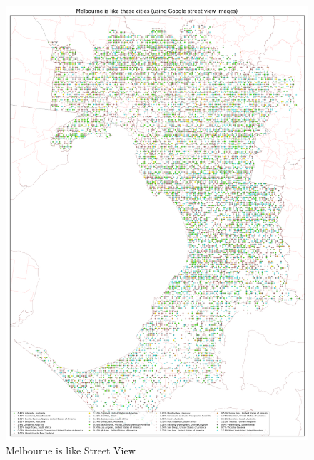 \documentclass[sageh,times]{sagej}
\begin{document}
\begin{figure}[!htbp]
\includegraphics[scale=0.20]{Images/MelbourneOverallAbrev_street.png} 
\caption{Melbourne is like Street View}    
 \label{fig:melstreet}  
\end{figure} 
\end{document}
